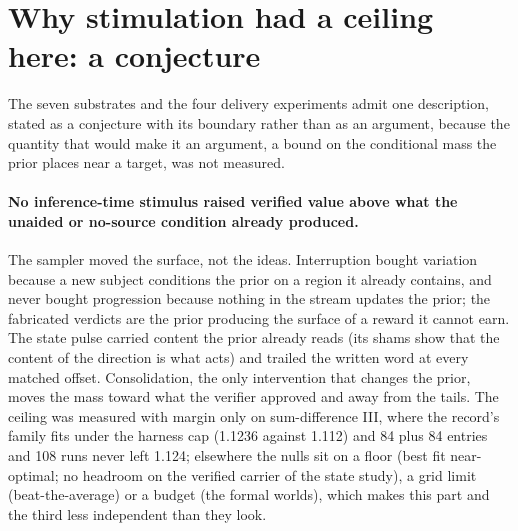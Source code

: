 \documentclass[11pt]{article}
\begin{document}
\section{Why stimulation had a ceiling here: a conjecture}
\label{sec:why}

The seven substrates and the four delivery experiments admit one
description, stated as a conjecture with its boundary rather than as an
argument, because the quantity that would make it an argument, a bound
on the conditional mass the prior places near a target, was not
measured.

\paragraph{No inference-time stimulus raised verified value above what the
unaided or no-source condition already produced.} The sampler moved the
surface, not the ideas. Interruption bought variation because a new
subject conditions the prior on a region it already contains, and never
bought progression because nothing in the stream updates the prior; the
fabricated verdicts are the prior producing the surface of a reward it
cannot earn. The state pulse carried content the prior already reads (its
shams show that the content of the direction is what acts) and trailed the
written word at every matched offset. Consolidation, the only intervention
that changes the prior, moves the mass toward what the verifier approved
and away from the tails. The ceiling was measured with margin only on
sum-difference III, where the record's family fits under the harness cap
(1.1236 against 1.112) and 84 plus 84 entries and 108 runs never left
1.124; elsewhere the nulls sit on a floor (best fit near-optimal; no
headroom on the verified carrier of the state study), a grid limit
(beat-the-average) or a budget (the formal worlds), which makes this part
and the third less independent than they look.
\end{document}
